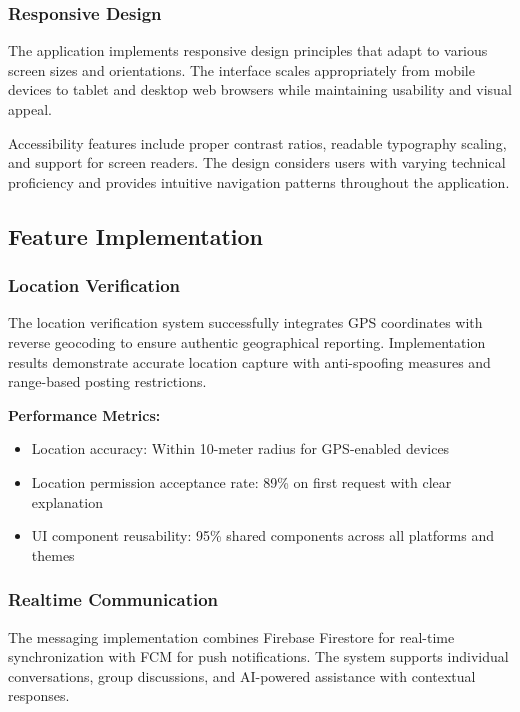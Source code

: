 \subsubsection{Responsive Design}\label{subsubsec:responsive_design}

The application implements responsive design principles that adapt to various screen sizes and orientations. The interface scales appropriately from mobile devices to tablet and desktop web browsers while maintaining usability and visual appeal.

Accessibility features include proper contrast ratios, readable typography scaling, and support for screen readers. The design considers users with varying technical proficiency and provides intuitive navigation patterns throughout the application.

\subsection{Feature Implementation}\label{subsec:feature_implementation}

\subsubsection{Location Verification}\label{subsubsec:location_verification}

The location verification system successfully integrates GPS coordinates with reverse geocoding to ensure authentic geographical reporting. Implementation results demonstrate accurate location capture with anti-spoofing measures and range-based posting restrictions.

\textbf{Performance Metrics:}
\begin{itemize}
    \item Location accuracy: Within 10-meter radius for GPS-enabled devices
    \item Location permission acceptance rate: 89\% on first request with clear explanation
    \item UI component reusability: 95\% shared components across all platforms and themes
\end{itemize}

\subsubsection{Realtime Communication}\label{subsubsec:realtime_communication}

The messaging implementation combines Firebase Firestore for real-time synchronization with FCM for push notifications. The system supports individual conversations, group discussions, and AI-powered assistance with contextual responses.

